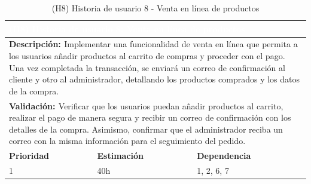 \begin{table}[H]
  \centering
  \renewcommand{\arraystretch}{1.5}
  \begin{tabular}{|p{}|p{}|p{}|}
    \hline
    \multicolumn{3}{|l|}{\cellcolor{OrangeVIU}\textcolor{white}{\textbf{(H8) Historia de usuario 8: Venta en línea de productos}}} \\
    \hline
    \multicolumn{3}{|p{\dimexpr0.9\linewidth+2\tabcolsep+2\arrayrulewidth}|}{{\textbf{\textcolor{naranja}{Descripción: }}}Implementar una funcionalidad de venta en línea que permita a los usuarios añadir productos al carrito de compras y proceder con el pago. Una vez completada la transacción, se enviará un correo de confirmación al cliente y otro al administrador, detallando los productos comprados y los datos de la compra.} \\
    \hline
    \multicolumn{3}{|p{\dimexpr0.9\linewidth+2\tabcolsep+2\arrayrulewidth}|}{{\textbf{\textcolor{naranja}{Validación: }} Verificar que los usuarios puedan añadir productos al carrito, realizar el pago de manera segura y recibir un correo de confirmación con los detalles de la compra. Asimismo, confirmar que el administrador reciba un correo con la misma información para el seguimiento del pedido.}} \\
    \hline
    {\textbf{\textcolor{naranja}{Prioridad }}}  & {\textbf{\textcolor{naranja}{Estimación }}}  & {\textbf{\textcolor{naranja}{Dependencia }}}  \\
    \hline
    1 &  40h &  1, 2, 6, 7 \\
    \hline
  \end{tabular}
  \caption{(H8) Historia de usuario 8 - Venta en línea de productos}
  \label{table:H8}
\end{table}

